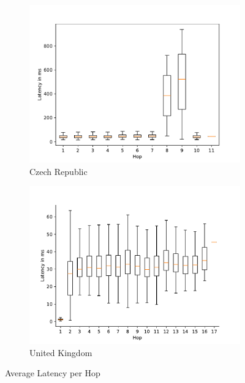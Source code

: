 \begin{figure}
\begin{subfigure}[b]{0.48\linewidth}
		\includegraphics[width=\linewidth]{chapters/4-results/traceroute/img/latency-per-hop-CZ.pdf}
		\caption{Czech Republic}
	\end{subfigure}
	\begin{subfigure}[b]{0.48\linewidth}
		\includegraphics[width=\linewidth]{chapters/4-results/traceroute/img/latency-per-hop-GB.pdf}
		\caption{United Kingdom}
	\end{subfigure}
	\caption{Average Latency per Hop}
	\label{fig:latency-change-per-hop-appendix}
\end{figure}


